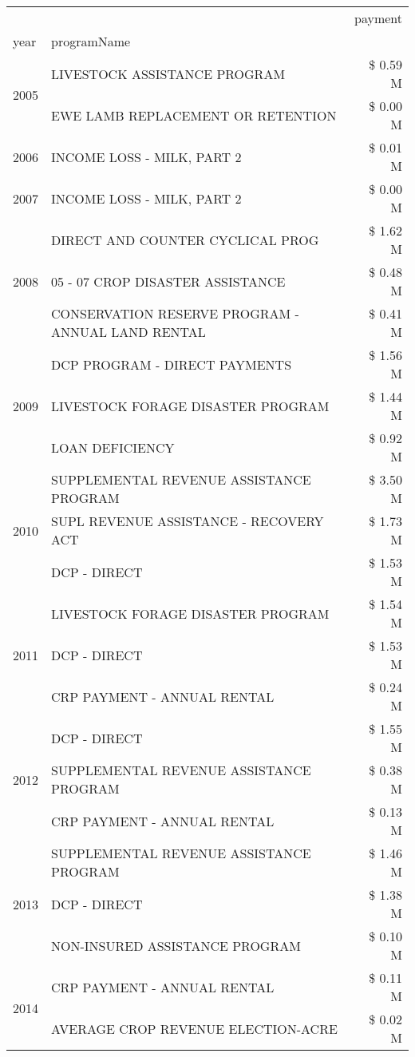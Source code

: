 \begin{tabular}{llr}
\toprule
 &  & payment \\
year & programName &  \\
\midrule
\multirow[t]{2}{*}{2005} & LIVESTOCK ASSISTANCE PROGRAM & \$ 0.59 M \\
 & EWE LAMB REPLACEMENT OR RETENTION & \$ 0.00 M \\
\cline{1-3}
2006 & INCOME LOSS - MILK, PART 2 & \$ 0.01 M \\
\cline{1-3}
2007 & INCOME LOSS - MILK, PART 2 & \$ 0.00 M \\
\cline{1-3}
\multirow[t]{3}{*}{2008} & DIRECT AND COUNTER CYCLICAL PROG & \$ 1.62 M \\
 & 05 - 07 CROP DISASTER ASSISTANCE & \$ 0.48 M \\
 & CONSERVATION RESERVE PROGRAM - ANNUAL LAND RENTAL & \$ 0.41 M \\
\cline{1-3}
\multirow[t]{3}{*}{2009} & DCP PROGRAM - DIRECT PAYMENTS & \$ 1.56 M \\
 & LIVESTOCK FORAGE DISASTER  PROGRAM & \$ 1.44 M \\
 & LOAN DEFICIENCY & \$ 0.92 M \\
\cline{1-3}
\multirow[t]{3}{*}{2010} & SUPPLEMENTAL REVENUE ASSISTANCE PROGRAM & \$ 3.50 M \\
 & SUPL REVENUE ASSISTANCE - RECOVERY ACT & \$ 1.73 M \\
 & DCP - DIRECT & \$ 1.53 M \\
\cline{1-3}
\multirow[t]{3}{*}{2011} & LIVESTOCK FORAGE DISASTER PROGRAM & \$ 1.54 M \\
 & DCP - DIRECT & \$ 1.53 M \\
 & CRP PAYMENT - ANNUAL RENTAL & \$ 0.24 M \\
\cline{1-3}
\multirow[t]{3}{*}{2012} & DCP - DIRECT & \$ 1.55 M \\
 & SUPPLEMENTAL REVENUE ASSISTANCE PROGRAM & \$ 0.38 M \\
 & CRP PAYMENT - ANNUAL RENTAL & \$ 0.13 M \\
\cline{1-3}
\multirow[t]{3}{*}{2013} & SUPPLEMENTAL REVENUE ASSISTANCE PROGRAM & \$ 1.46 M \\
 & DCP - DIRECT & \$ 1.38 M \\
 & NON-INSURED ASSISTANCE PROGRAM & \$ 0.10 M \\
\cline{1-3}
\multirow[t]{3}{*}{2014} & CRP PAYMENT - ANNUAL RENTAL & \$ 0.11 M \\
 & AVERAGE CROP REVENUE ELECTION-ACRE & \$ 0.02 M \\

\end{tabular}
